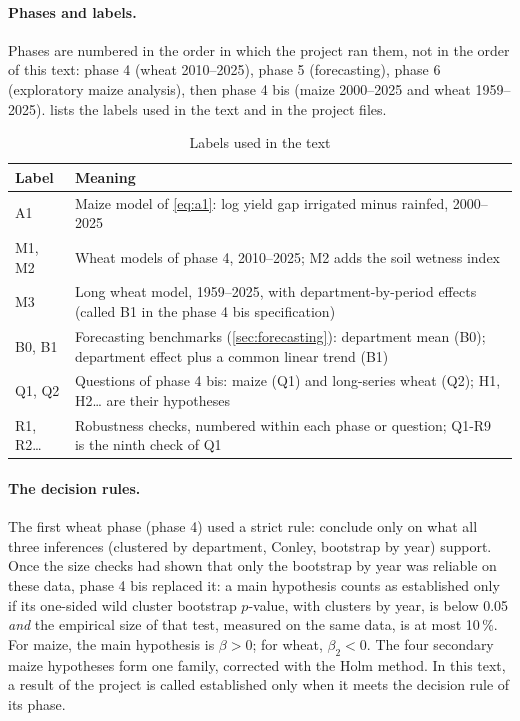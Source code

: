 \paragraph{Phases and labels.} Phases are numbered in the order in which the project ran them, not in the order of this text: phase 4 (wheat 2010--2025), phase 5 (forecasting), phase 6 (exploratory maize analysis), then phase 4 bis (maize 2000--2025 and wheat 1959--2025).  lists the labels used in the text and in the project files.

\begin{table}[H]
\centering
\small
\caption{Labels used in the text}
\label{tab:labels}
\begin{tabular}{>{\raggedright}p{2.4cm}>{\raggedright\arraybackslash}p{10.6cm}}
\toprule
Label & Meaning \\
\midrule
A1 & Maize model of \cref{eq:a1}: log yield gap irrigated minus rainfed, 2000--2025 \\
M1, M2 & Wheat models of phase 4, 2010--2025; M2 adds the soil wetness index \\
M3 & Long wheat model, 1959--2025, with department-by-period effects (called B1 in the phase 4 bis specification) \\
B0, B1 & Forecasting benchmarks (\cref{sec:forecasting}): department mean (B0); department effect plus a common linear trend (B1) \\
Q1, Q2 & Questions of phase 4 bis: maize (Q1) and long-series wheat (Q2); H1, H2\ldots{} are their hypotheses \\
R1, R2\ldots & Robustness checks, numbered within each phase or question; Q1-R9 is the ninth check of Q1 \\
\bottomrule
\end{tabular}
\end{table}

\paragraph{The decision rules.} The first wheat phase (phase 4) used a strict rule: conclude only on what all three inferences (clustered by department, Conley, bootstrap by year) support. Once the size checks had shown that only the bootstrap by year was reliable on these data, phase 4 bis replaced it: a main hypothesis counts as established only if its one-sided wild cluster bootstrap $p$-value, with clusters by year, is below 0.05 \emph{and} the empirical size of that test, measured on the same data, is at most 10\,\%. For maize, the main hypothesis is $\beta > 0$; for wheat, $\beta_2 < 0$. The four secondary maize hypotheses form one family, corrected with the Holm method. In this text, a result of the project is called established only when it meets the decision rule of its phase.

